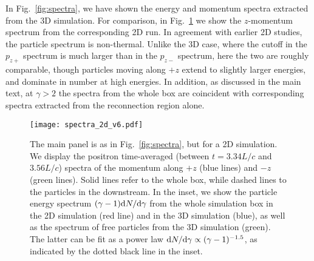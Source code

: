 \documentclass[twocolumn,twocolappendix]{aastex63}
\begin{document}
In Fig.~\ref{fig:spectra}, we have shown the energy and momentum spectra extracted from the 3D simulation. For comparison, in Fig.~\ref{fig:spect_2d} we show the $z$-momentum spectrum from the corresponding 2D run. In agreement with earlier 2D studies, the particle spectrum is non-thermal. Unlike the 3D case, where the cutoff in the $p_{z+}$ spectrum is much larger than in the $p_{z-}$ spectrum, here the two are roughly comparable, though particles moving along $+z$ extend to slightly larger energies, and dominate in number at high energies. In addition, as discussed in the main text, at $\gamma>2$ the spectra from the whole box are coincident with corresponding spectra extracted from the reconnection region alone.

\begin{figure}
    \texttt{[image: spectra\_2d\_v6.pdf]}
    \caption{The main panel is as in Fig.~\ref{fig:spectra}, but for a 2D simulation. We display the positron time-averaged (between $t = 3.34L/c$ and $3.56L/c$) spectra of the momentum along $+z$ (blue lines) and $-z$  (green lines). 
    Solid lines refer to the whole box, while dashed lines to the particles in the downstream.  In the inset, we show the particle energy spectrum $(\gamma-1){\rm d}N/{\rm d}\gamma$ from the whole simulation box in the 2D simulation (red line) and in the 3D simulation (blue), as well as the spectrum of free particles from the 3D simulation (green). The latter can be fit as a power law ${\rm d}N/{\rm d}\gamma\propto (\gamma-1)^{-1.5}$, as indicated by the dotted black line in the inset. %
    }
    \label{fig:spect_2d}
\end{figure}
\end{document}
